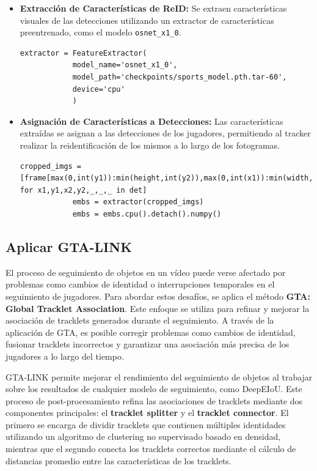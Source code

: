 \documentclass[12pt, a4paper, twoside]{article}
\begin{document}
	\begin{itemize}
		\item \textbf{Extracción de Características de ReID:}  
		Se extraen características visuales de las detecciones utilizando un extractor de características preentrenado, como el modelo \texttt{osnet\_x1\_0}.
		\begin{lstlisting}[style=pythonstyle]
			extractor = FeatureExtractor(
			model_name='osnet_x1_0',
			model_path='checkpoints/sports_model.pth.tar-60',
			device='cpu'
			)
		\end{lstlisting}
		
		\item \textbf{Asignación de Características a Detecciones:}  
		Las características extraídas se asignan a las detecciones de los jugadores, permitiendo al tracker realizar la reidentificación de los mismos a lo largo de los fotogramas.
		\begin{lstlisting}[style=pythonstyle]
			cropped_imgs = [frame[max(0,int(y1)):min(height,int(y2)),max(0,int(x1)):min(width,int(x2))] for x1,y1,x2,y2,_,_,_ in det]
			embs = extractor(cropped_imgs)
			embs = embs.cpu().detach().numpy()
		\end{lstlisting}
	\end{itemize}
	
	
	
	\subsection{Aplicar GTA-LINK}
	
	El proceso de seguimiento de objetos en un vídeo puede verse afectado por problemas como cambios de identidad o interrupciones temporales en el seguimiento de jugadores. Para abordar estos desafíos, se aplica el método \textbf{GTA: Global Tracklet Association}. Este enfoque se utiliza para refinar y mejorar la asociación de tracklets generados durante el seguimiento. A través de la aplicación de GTA, es posible corregir problemas como cambios de identidad, fusionar tracklets incorrectos y garantizar una asociación más precisa de los jugadores a lo largo del tiempo.
	
	GTA-LINK permite mejorar el rendimiento del seguimiento de objetos al trabajar sobre los resultados de cualquier modelo de seguimiento, como DeepEIoU. Este proceso de post-procesamiento refina las asociaciones de tracklets mediante dos componentes principales: el \textbf{tracklet splitter} y el \textbf{tracklet connector}. El primero se encarga de dividir tracklets que contienen múltiples identidades utilizando un algoritmo de clustering no supervisado basado en densidad, mientras que el segundo conecta los tracklets correctos mediante el cálculo de distancias promedio entre las características de los tracklets.
	
\end{document}
